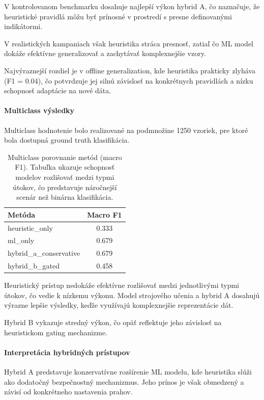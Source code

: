 \documentclass[conference]{IEEEtran}
\begin{document}
V kontrolovanom benchmarku dosahuje najlepší výkon hybrid A,
čo naznačuje, že heuristické pravidlá môžu byť prínosné
v prostredí s presne definovanými indikátormi.

V realistických kampaniach však heuristika stráca presnosť,
zatiaľ čo ML model dokáže efektívne generalizovať a zachytávať
komplexnejšie vzory.

Najvýraznejší rozdiel je v offline generalization,
kde heuristika prakticky zlyháva (F1 = 0.04),
čo potvrdzuje jej silnú závislosť na konkrétnych pravidlách
a nízku schopnosť adaptácie na nové dáta.

\paragraph{Multiclass výsledky}

Multiclass hodnotenie bolo realizované na podmnožine 1250 vzoriek,
pre ktoré bola dostupná ground truth klasifikácia.

\begin{table}[H]
\centering
\begin{tabular}{lc}
\hline
Metóda & Macro F1 \\
\hline
heuristic\_only & 0.333 \\
ml\_only & 0.679 \\
hybrid\_a\_conservative & 0.679 \\
hybrid\_b\_gated & 0.458 \\
\hline
\end{tabular}
\caption{Multiclass porovnanie metód (macro F1). Tabuľka ukazuje schopnosť modelov rozlišovať medzi typmi útokov, čo predstavuje náročnejší scenár než binárna klasifikácia.}
\end{table}

Heuristický prístup nedokáže efektívne rozlišovať medzi jednotlivými typmi útokov,
čo vedie k nízkemu výkonu. Model strojového učenia a hybrid A dosahujú výrazne
lepšie výsledky, keďže využívajú komplexnejšie reprezentácie dát.

Hybrid B vykazuje stredný výkon, čo opäť reflektuje jeho závislosť
na heuristickom gating mechanizme.

\paragraph{Interpretácia hybridných prístupov}

Hybrid A predstavuje konzervatívne rozšírenie ML modelu,
kde heuristika slúži ako dodatočný bezpečnostný mechanizmus.
Jeho prínos je však obmedzený a závisí od konkrétneho nastavenia prahov.
\end{document}
